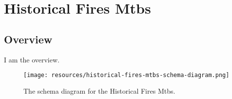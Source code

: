 \section{Historical Fires Mtbs}
\label{sec:historical-fires-mtbs}
\subsection{Overview}
\label{ssec:overview}

I am the overview.

\begin{figure}[h!]
  \begin{center}
    \texttt{[image: resources/historical-fires-mtbs-schema-diagram.png]}
  \end{center}
  \caption{The schema diagram for the Historical Fires Mtbs.}
  \label{fig:ov-diagram}
\end{figure}


